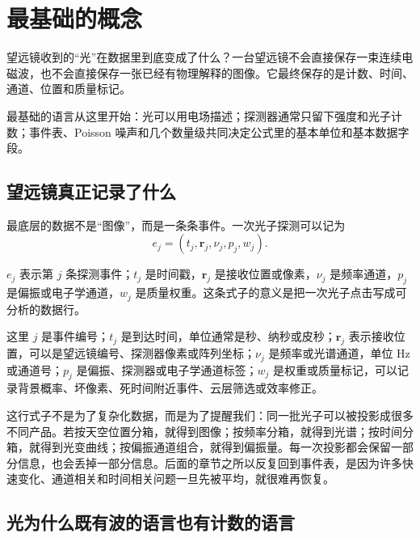 \chapter{最基础的概念}
\label{chap:01}

\begin{chapteropening}
望远镜收到的“光”在数据里到底变成了什么？一台望远镜不会直接保存一束连续电磁波，也不会直接保存一张已经有物理解释的图像。它最终保存的是计数、时间、通道、位置和质量标记。

最基础的语言从这里开始：光可以用电场描述；探测器通常只留下强度和光子计数；事件表、Poisson 噪声和几个数量级共同决定公式里的基本单位和基本数据字段。
\end{chapteropening}

\section{望远镜真正记录了什么}
\label{sec:1-language}

最底层的数据不是“图像”，而是一条条事件。一次光子探测可以记为
\begin{equation}
  e_j=(t_j,\bm{r}_j,\nu_j,p_j,w_j).
  \label{eq:event-row}
\end{equation}
\begin{formulaexplain}
\(e_j\) 表示第 \(j\) 条探测事件；\(t_j\) 是时间戳，\(\bm r_j\) 是接收位置或像素，\(\nu_j\) 是频率通道，\(p_j\) 是偏振或电子学通道，\(w_j\) 是质量权重。这条式子的意义是把一次光子点击写成可分析的数据行。
\end{formulaexplain}
这里 \(j\) 是事件编号；\(t_j\) 是到达时间，单位通常是秒、纳秒或皮秒；\(\bm r_j\) 表示接收位置，可以是望远镜编号、探测器像素或阵列坐标；\(\nu_j\) 是频率或光谱通道，单位 Hz 或通道号；\(p_j\) 是偏振、探测器或电子学通道标签；\(w_j\) 是权重或质量标记，可以记录背景概率、坏像素、死时间附近事件、云层筛选或效率修正。

这行式子不是为了复杂化数据，而是为了提醒我们：同一批光子可以被投影成很多不同产品。若按天空位置分箱，就得到图像；按频率分箱，就得到光谱；按时间分箱，就得到光变曲线；按偏振通道组合，就得到偏振量。每一次投影都会保留一部分信息，也会丢掉一部分信息。后面的章节之所以反复回到事件表，是因为许多快速变化、通道相关和时间相关问题一旦先被平均，就很难再恢复。

\section{光为什么既有波的语言也有计数的语言}
\label{sec:1-light}

